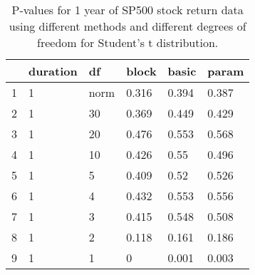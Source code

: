 \begin{table}[ht]
\centering
\caption{P-values for 1 year of SP500 stock return data using different 
  methods
  and different degrees of freedom for Student's t distribution.} 
\label{table:SP5001}
\begin{tabular}{rlllll}
  \hline
 & duration & df & block & basic & param \\ 
  \hline
1 & 1 & norm & 0.316 & 0.394 & 0.387 \\ 
  2 & 1 & 30 & 0.369 & 0.449 & 0.429 \\ 
  3 & 1 & 20 & 0.476 & 0.553 & 0.568 \\ 
  4 & 1 & 10 & 0.426 & 0.55 & 0.496 \\ 
  5 & 1 & 5 & 0.409 & 0.52 & 0.526 \\ 
  6 & 1 & 4 & 0.432 & 0.553 & 0.556 \\ 
  7 & 1 & 3 & 0.415 & 0.548 & 0.508 \\ 
  8 & 1 & 2 & 0.118 & 0.161 & 0.186 \\ 
  9 & 1 & 1 & 0 & 0.001 & 0.003 \\ 
   \hline
\end{tabular}
\end{table}

